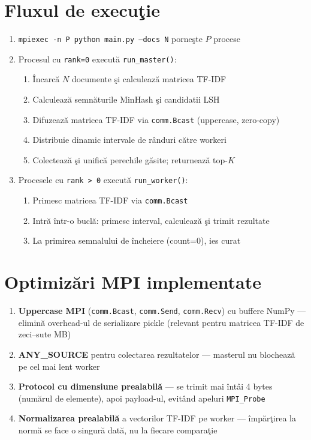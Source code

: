 \documentclass[a4paper,12pt]{report}
\begin{document}
\section{Fluxul de execu\c{t}ie}

\begin{enumerate}
  \item \texttt{mpiexec -n P python main.py --docs N} porne\c{s}te $P$ procese
  \item Procesul cu \texttt{rank=0} execut\u{a} \texttt{run\_master()}:
  \begin{enumerate}
    \item \^{I}ncarc\u{a} $N$ documente \c{s}i calculeaz\u{a} matricea TF-IDF
    \item Calculeaz\u{a} semn\u{a}turile MinHash \c{s}i candidatii LSH
    \item Difuzeaz\u{a} matricea TF-IDF via \texttt{comm.Bcast} (uppercase, zero-copy)
    \item Distribuie dinamic intervale de r\^{a}nduri c\u{a}tre workeri
    \item Colecteaz\u{a} \c{s}i unific\u{a} perechile g\u{a}site; returneaz\u{a} top-$K$
  \end{enumerate}
  \item Procesele cu \texttt{rank > 0} execut\u{a} \texttt{run\_worker()}:
  \begin{enumerate}
    \item Primesc matricea TF-IDF via \texttt{comm.Bcast}
    \item Intr\u{a} \^{i}ntr-o bucl\u{a}: primesc interval, calculeaz\u{a} \c{s}i trimit rezultate
    \item La primirea semnalului de \^{i}ncheiere (count=0), ies curat
  \end{enumerate}
\end{enumerate}

\section{Optimiz\u{a}ri MPI implementate}

\begin{enumerate}
  \item \textbf{Uppercase MPI} (\texttt{comm.Bcast}, \texttt{comm.Send}, \texttt{comm.Recv}) cu buffere NumPy — elimin\u{a} overhead-ul de serializare pickle (relevant pentru matricea TF-IDF de zeci--sute MB)
  \item \textbf{ANY\_SOURCE} pentru colectarea rezultatelor — masterul nu blocheaz\u{a} pe cel mai lent worker
  \item \textbf{Protocol cu dimensiune prealabil\u{a}} — se trimit mai \^{i}nt\^{a}i 4 bytes (num\u{a}rul de elemente), apoi payload-ul, evit\^{a}nd apeluri \texttt{MPI\_Probe}
  \item \textbf{Normalizarea prealabil\u{a}} a vectorilor TF-IDF pe worker — \^{i}mp\u{a}r\c{t}irea la norm\u{a} se face o singur\u{a} dat\u{a}, nu la fiecare compara\c{t}ie
\end{enumerate}
\end{document}
